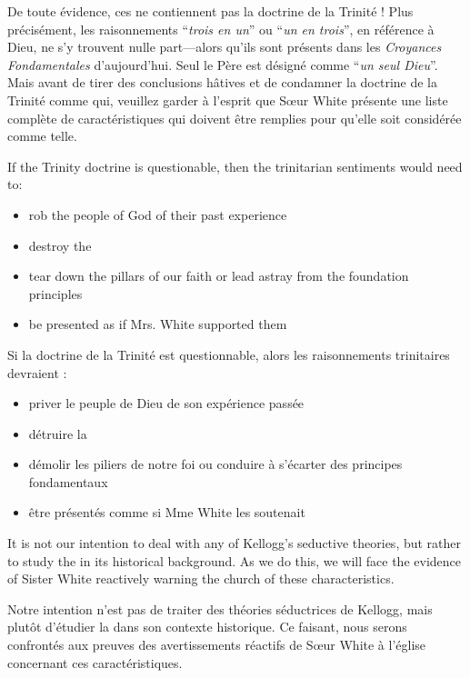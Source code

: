 De toute évidence, ces  ne contiennent pas la doctrine de la Trinité ! Plus précisément, les raisonnements “\textit{trois en un}” ou “\textit{un en trois}”, en référence à Dieu, ne s'y trouvent nulle part—alors qu'ils sont présents dans les \textit{Croyances Fondamentales} d'aujourd'hui. Seul le Père est désigné comme “\textit{un seul Dieu}”. Mais avant de tirer des conclusions hâtives et de condamner la doctrine de la Trinité comme qui, veuillez garder à l'esprit que Sœur White présente une liste complète de caractéristiques qui doivent être remplies pour qu'elle soit considérée comme telle.


If the Trinity doctrine is questionable, then the trinitarian sentiments would need to:
\begin{itemize}
    \item rob the people of God of their past experience
    \item destroy the 
    \item tear down the pillars of our faith or lead astray from the foundation principles
    \item be presented as if Mrs. White supported them
\end{itemize}


Si la doctrine de la Trinité est questionnable, alors les raisonnements trinitaires devraient :
\begin{itemize}
    \item priver le peuple de Dieu de son expérience passée
    \item détruire la 
    \item démolir les piliers de notre foi ou conduire à s'écarter des principes fondamentaux
    \item être présentés comme si Mme White les soutenait
\end{itemize}


It is not our intention to deal with any of Kellogg’s seductive theories, but rather to study the  in its historical background. As we do this, we will face the evidence of Sister White reactively warning the church of these characteristics.


Notre intention n'est pas de traiter des théories séductrices de Kellogg, mais plutôt d'étudier la  dans son contexte historique. Ce faisant, nous serons confrontés aux preuves des avertissements réactifs de Sœur White à l'église concernant ces caractéristiques.

